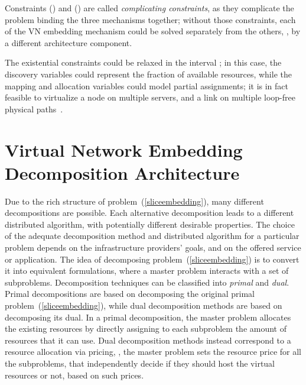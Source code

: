 \documentclass[a4paper, 10pt, conference]{ieeeconf}
\begin{document}
Constraints () and () are called {\it complicating constraints}, as they complicate the problem binding the three mechanisms together;  without those constraints, each of the VN embedding mechanism could be solved separately from the others,  , by a different architecture component. 

The existential constraints  could be relaxed in the interval ; in this case, the discovery variables could represent the fraction of available resources, while the mapping and allocation variables could model partial assignments; it is in fact feasible to virtualize a node on multiple servers, and a link on multiple loop-free physical paths~\cite{pathsplitting}. 






\section{Virtual Network Embedding \\ Decomposition Architecture}\label{sec:dec}







Due to the rich structure of problem~(\ref{sliceembedding}), many different decompositions are possible.  
 Each alternative decomposition leads to a different distributed algorithm, with potentially different desirable properties. 
The choice of the adequate decomposition method and distributed algorithm for a particular problem depends on the infrastructure providers' goals, and on the offered service or application. 
The idea of decomposing problem~(\ref{sliceembedding}) is to convert it into equivalent formulations, where a master problem interacts with a set of subproblems. Decomposition techniques can be classified into {\it primal} and {\it dual}. Primal decompositions are based on decomposing the original primal problem~(\ref{sliceembedding}), while dual decomposition methods are based on decomposing its dual. 
In a primal decomposition, the master problem allocates the existing resources by directly assigning to each subproblem the amount of resources that it can use. Dual decomposition methods instead correspond to a resource allocation via pricing, , the master problem sets the resource price for all the subproblems, that independently decide if they should host the virtual resources or not, based on such prices.
\end{document}
